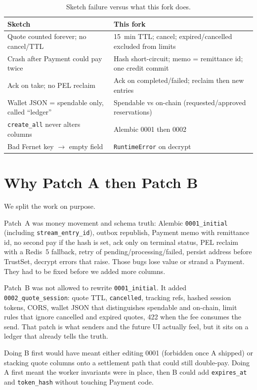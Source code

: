 \documentclass[11pt]{article}
\begin{document}
\begin{table}[ht]
\centering
\caption{Sketch failure versus what this fork does.}
\label{tab:bugs}
\footnotesize
\begin{tabular}{@{}p{}p{}@{}}
\toprule
\textbf{Sketch} & \textbf{This fork} \\
\midrule
Quote counted forever; no cancel/TTL &
15~min TTL; cancel; expired/cancelled excluded from limits \\
Crash after Payment could pay twice &
Hash short-circuit; memo = remittance id; one credit commit \\
Ack on take; no PEL reclaim &
Ack on completed/failed; reclaim then new entries \\
Wallet JSON = spendable only, called ``ledger'' &
Spendable vs on-chain (requested/approved reservations) \\
\texttt{create\_all} never alters columns &
Alembic 0001 then 0002 \\
Bad Fernet key $\to$ empty field &
\texttt{RuntimeError} on decrypt \\
\bottomrule
\end{tabular}
\end{table}

\section{Why Patch A then Patch B}
We split the work on purpose.

Patch~A was money movement and schema truth: Alembic \texttt{0001\_initial} (including \texttt{stream\_entry\_id}), outbox republish, Payment memo with remittance id, no second pay if the hash is set, ack only on terminal status, PEL reclaim with a Redis~5 fallback, retry of pending/processing/failed, persist address before TrustSet, decrypt errors that raise. Those bugs lose value or strand a Payment. They had to be fixed before we added more columns.

Patch~B was not allowed to rewrite \texttt{0001\_initial}. It added \texttt{0002\_quote\_session}: quote TTL, \texttt{cancelled}, tracking refs, hashed session tokens, CORS, wallet JSON that distinguishes spendable and on-chain, limit rules that ignore cancelled and expired quotes, 422 when the fee consumes the send. That patch is what senders and the future UI actually feel, but it sits on a ledger that already tells the truth.

Doing B first would have meant either editing 0001 (forbidden once A shipped) or stacking quote columns onto a settlement path that could still double-pay. Doing A first meant the worker invariants were in place, then B could add \texttt{expires\_at} and \texttt{token\_hash} without touching Payment code.
\end{document}
